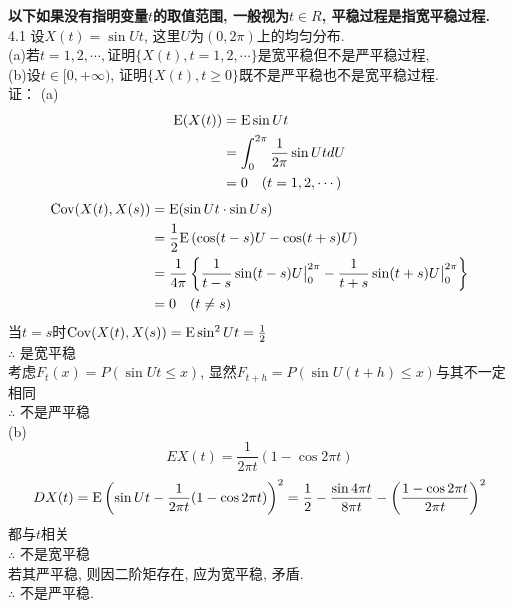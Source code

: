 

{\bf 以下如果没有指明变量$t$的取值范围, 一般视为$t \in R$, 平稳过程是指宽平稳过程.}\\
4.1 设$X(t) = \sin Ut$, 这里$U$为$(0, 2\pi)$上的均匀分布.\\
(a)若$t = 1, 2, \cdots , $证明$\{X(t), t = 1, 2, \cdots\}$是宽平稳但不是严平稳过程,\\
(b)设$t \in [0, +\infty)$, 证明$\{X(t) , t \geqslant 0\}$既不是严平稳也不是宽平稳过程.\\
证：
(a)
	\[
	\begin{split}
	\mathrm{E}(X(t)) & = \mathrm{E} \sin Ut\\
			& = \int^{2\pi}_0 \frac{1}{2\pi}\sin Ut dU\\
			& = 0 ~~~(t = 1,2,\cdots)
	\end{split}
	\]
	\[
	\begin{split}
	\mathrm{Cov}(X(t), X(s)) & = \mathrm{E}(\sin Ut \cdot \sin Us)\\
					& = \frac{1}{2}\mathrm{E}\left(\cos(t-s)U-\cos(t+s)U\right)\\
					& = \frac{1}{4\pi}\left\{\frac{1}{t-s}\sin(t-s)U\big |^{2\pi}_0 - \frac{1}{t+s}\sin(t+s)U\big |^{2\pi}_0\right\}\\
					& = 0 ~~~(t\neq s)
	\end{split}
	\]
	当$t=s$时$\mathrm{Cov}(X(t), X(s)) = \mathrm{E}\sin^2 Ut = \frac{1}{2}$\\
	$\therefore$ 是宽平稳\\
	考虑$F_t(x) = P(\sin Ut \leqslant x)$, 显然$F_{t+h} = P\left(\sin U(t+h) \leqslant x\right)$与其不一定相同\\
	$\therefore$ 不是严平稳\\
	(b)\[
	EX(t) = \frac{1}{2\pi t}(1-\cos2\pi t)
	\]
	\[
	DX(t) = \mathrm{E}\left(\sin Ut - \frac{1}{2\pi t}(1-\cos2\pi t)\right)^2 = \frac{1}{2} - \frac{\sin4\pi t}{8\pi t} - \left(\frac{1-\cos2\pi t}{2\pi t}\right)^2
	\]
	都与$t$相关\\
	$\therefore$ 不是宽平稳\\
	若其严平稳, 则因二阶矩存在, 应为宽平稳, 矛盾.\\
	$\therefore$ 不是严平稳.\\


